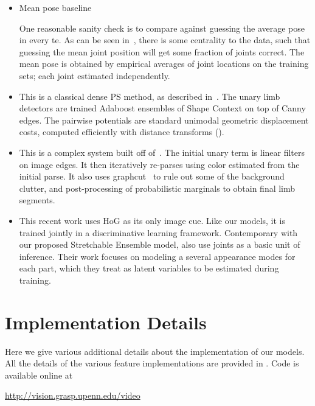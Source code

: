\begin{itemize}
\item Mean pose baseline 

One reasonable sanity check is to compare against guessing the average pose in every te.  As 
can be seen in~, there is some centrality to the 
data, such that guessing the mean joint position will get some fraction of joints 
correct.  The mean pose is obtained by empirical averages of joint locations on 
the training sets; each joint estimated independently.

\item \citet{andriluka09} 

This is a classical dense PS method, as described in~.  The unary 
limb detectors are trained Adaboost ensembles of Shape Context on top of Canny 
edges.  The pairwise potentials are standard unimodal geometric displacement 
costs, computed efficiently with distance transforms ().

\item \citet{eichner09} 

This is a complex system built off of~\citet{devacrf}.  The initial unary term 
is linear filters on image edges.  It then iteratively re-parses using color 
estimated from the initial parse.  It also uses graphcut~\citep{boykov2001} to 
rule out some of the background clutter, and post-processing of probabilistic 
marginals to obtain final limb segments.

\item \citet{deva2011} 

This recent work uses HoG as its only image cue.  Like our models, it is 
trained jointly in a discriminative learning framework.  Contemporary with our 
proposed Stretchable Ensemble model, \citet{deva2011} also use joints as a 
basic unit of inference.  Their work focuses on modeling a several appearance 
modes for each part, which they treat as latent variables to be estimated 
during training.  \end{itemize}


\section{Implementation Details}\label{sec:impl-details}

Here we give various additional details about the implementation of our models. 
All the details of the various feature implementations are provided in 
. Code is available online at \begin{center} 
\url{http://vision.grasp.upenn.edu/video} \end{center}

